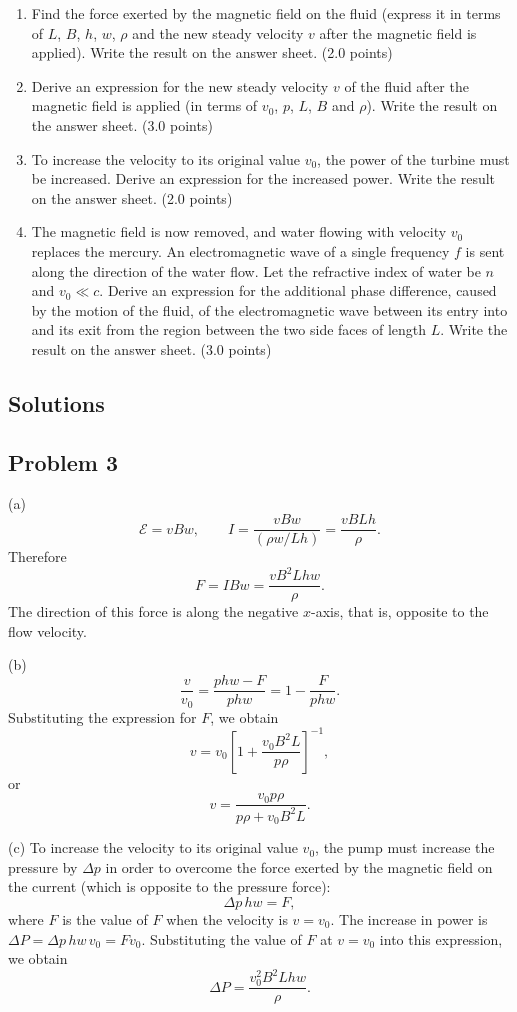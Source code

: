 \begin{enumerate}
\item[(a)] Find the force exerted by the magnetic field on the fluid (express it in terms of $L$, $B$, $h$, $w$, $\rho$ and the new steady velocity $v$ after the magnetic field is applied). Write the result on the answer sheet. (2.0 points)
\item[(b)] Derive an expression for the new steady velocity $v$ of the fluid after the magnetic field is applied (in terms of $v_0$, $p$, $L$, $B$ and $\rho$). Write the result on the answer sheet. (3.0 points)
\item[(c)] To increase the velocity to its original value $v_0$, the power of the turbine must be increased. Derive an expression for the increased power. Write the result on the answer sheet. (2.0 points)
\item[(d)] The magnetic field is now removed, and water flowing with velocity $v_0$ replaces the mercury. An electromagnetic wave of a single frequency $f$ is sent along the direction of the water flow. Let the refractive index of water be $n$ and $v_0\ll c$. Derive an expression for the additional phase difference, caused by the motion of the fluid, of the electromagnetic wave between its entry into and its exit from the region between the two side faces of length $L$. Write the result on the answer sheet. (3.0 points)
\end{enumerate}

\subsection*{Solutions}

\subsection*{Problem 3}

(a)
\[
\mathcal{E}=vBw,\qquad I=\frac{vBw}{(\rho w/Lh)}=\frac{vBLh}{\rho}.
\]
Therefore
\[
F=IBw=\frac{vB^2Lhw}{\rho}.
\]
The direction of this force is along the negative $x$-axis, that is, opposite to the flow velocity.

(b)
\[
\frac{v}{v_0}=\frac{phw-F}{phw}=1-\frac{F}{phw}.
\]
Substituting the expression for $F$, we obtain
\[
v=v_0\left[1+\frac{v_0B^2L}{p\rho}\right]^{-1},
\]
or
\[
v=\frac{v_0p\rho}{p\rho+v_0B^2L}.
\]

(c) To increase the velocity to its original value $v_0$, the pump must increase the pressure by $\Delta p$ in order to overcome the force exerted by the magnetic field on the current (which is opposite to the pressure force):
\[
\Delta p\,hw=F,
\]
where $F$ is the value of $F$ when the velocity is $v=v_0$. The increase in power is $\Delta P=\Delta p\,hw\,v_0=Fv_0$. Substituting the value of $F$ at $v=v_0$ into this expression, we obtain
\[
\Delta P=\frac{v_0^2B^2Lhw}{\rho}.
\]

